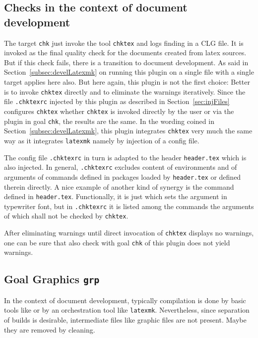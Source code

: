 \subsection{Checks in the context of document development}\label{subsec:develCheck}

The target \texttt{chk} just invoke the tool \texttt{chktex} and logs finding in a CLG file. 
It is invoked as the final quality check for the documents created from latex sources. 
But if this check fails, there is a transition to document development. 
As said in Section~\ref{subsec:develLatexmk} on running this plugin on a single file with a single target 
applies here also. 
But here again, this plugin is not the first choice: Better is to invoke \texttt{chktex} directly 
and to eliminate the warnings iteratively. 
Since the file \texttt{.chktexrc} injected by this plugin as described in Section~\ref{sec:injFiles} 
configures \texttt{chktex} whether \texttt{chktex} is invoked directly by the user 
or via the plugin in goal \texttt{chk}, the results are the same. 
In the wording coined in Section~\ref{subsec:develLatexmk}, 
this plugin integrates \texttt{chktex} very much the same way as it integrates \texttt{latexmk} 
namely by injection of a config file. 

The config file \texttt{.chktexrc} in turn is adapted to the header \texttt{header.tex} 
which is also injected. 
In general, \texttt{.chktexrc} excludes content of environments 
and of arguments of commands defined in packages loaded by \texttt{header.tex} 
or defined therein directly. 
A nice example of another kind of synergy is the command  
defined in \texttt{header.tex}. 
Functionally, it is just  which sets the argument in typewriter font, 
but in \texttt{.chktexrc} it is listed among the commands 
the arguments of which shall not be checked by \texttt{chktex}. 
\medskip


After eliminating warnings until direct invocation of \texttt{chktex} displays no warnings, 
one can be sure that also check with goal \texttt{chk} of this plugin does not yield warnings. 


\subsection{Goal Graphics \texttt{grp}}\label{subsec:develGraph}

In the context of document development, 
typically compilation is done by basic tools like \lualatex{} 
or by an orchestration tool like \texttt{latexmk}. 
Nevertheless, since separation of builds is desirable, 
intermediate files like graphic files are not present. 
Maybe they are removed by cleaning. 

